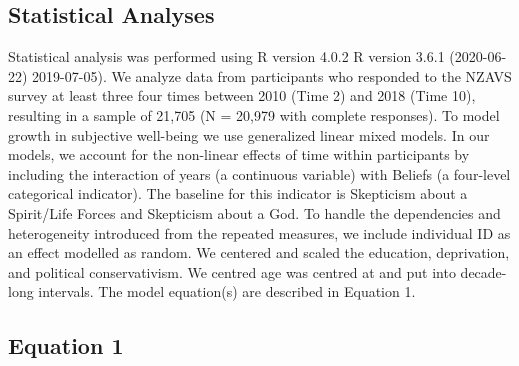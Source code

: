 \documentclass[
  english,
  man]{apa6}
\begin{document}
\hypertarget{statistical-analyses}{%
\subsection{Statistical Analyses}\label{statistical-analyses}}

Statistical analysis was performed using R version 4.0.2 R version 3.6.1 (2020-06-22) 2019-07-05). We analyze data from participants who responded to the NZAVS survey at least three four times between 2010 (Time 2) and 2018 (Time 10), resulting in a sample of 21,705 (N = 20,979 with complete responses). To model growth in subjective well-being we use generalized linear mixed models. In our models, we account for the non-linear effects of time within participants by including the interaction of years (a continuous variable) with Beliefs (a four-level categorical indicator). The baseline for this indicator is Skepticism about a Spirit/Life Forces and Skepticism about a God. To handle the dependencies and heterogeneity introduced from the repeated measures, we include individual ID as an effect modelled as random. We centered and scaled the education, deprivation, and political conservativism. We centred age was centred at and put into decade-long intervals.
The model equation(s) are described in Equation 1.

\hypertarget{equation-1}{%
\subsection{Equation 1}\label{equation-1}}
\end{document}
